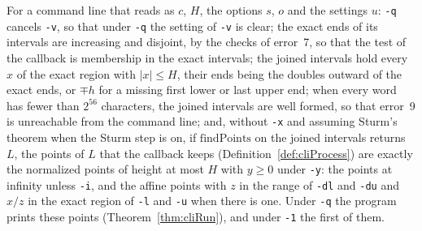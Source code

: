 \begin{theorem}\label{thm:cliRegion}
  \leanok
  For a command line that reads as $c$, $H$, the options $s$, $o$ and the settings $u$: \verb|-q|
  cancels \verb|-v|, so that under \verb|-q| the setting of \verb|-v| is clear; the exact ends of
  its intervals are increasing and disjoint, by the checks of error~7, so that the test of the
  callback is membership in the exact intervals; the joined intervals hold every $x$ of the exact
  region with $|x| \le H$, their ends being the doubles outward of the exact ends, or $\mp h$ for a
  missing first lower or last upper end; when every word has fewer than $2^{56}$ characters, the
  joined intervals are well formed, so that error~9 is unreachable from the command line; and,
  without \verb|-x| and assuming Sturm's theorem when the Sturm step is on, if $\mathrm{findPoints}$
  on the joined intervals returns $L$, the points of $L$ that the callback keeps
  (Definition~\ref{def:cliProcess}) are exactly the normalized points of height at most $H$ with
  $y \ge 0$ under \verb|-y|: the points at infinity unless \verb|-i|, and the affine points with $z$
  in the range of \verb|-dl| and \verb|-du| and $x/z$ in the exact region of \verb|-l| and \verb|-u|
  when there is one. Under \verb|-q| the program prints these points (Theorem~\ref{thm:cliRun}), and
  under \verb|-1| the first of them.
\end{theorem}

